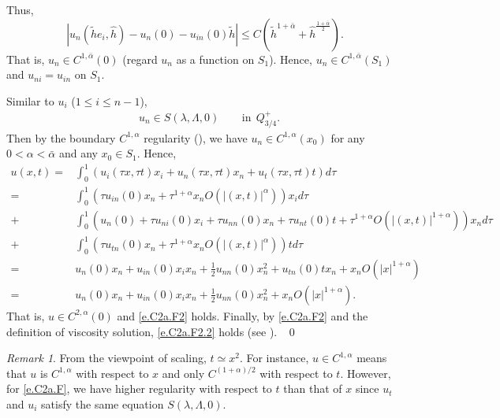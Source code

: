 \documentclass[preprint,12pt]{elsarticle}
\theoremstyle{definition}
\theoremstyle{remark}
\newtheorem{remark}[theorem]{Remark}
\numberwithin{equation}{section}
\begin{document}
Thus,
\begin{equation*}
  |u_n(\tilde{h}e_i,\hat{h})-u_n(0)-u_{in}(0)\tilde{h}|
  \leq C\left(\tilde{h}^{1+\bar{\alpha}}+\hat{h}^{\frac{1+\bar{\alpha}}{2}}\right).
\end{equation*}
That is, $u_n\in C^{1,\bar{\alpha}}(0)$ (regard $u_n$ as a function on $S_1$). Hence, $u_n\in C^{1,\bar{\alpha}}(S_{1})$ and $u_{ni}=u_{in}$ on $S_{1}$.

Similar to $u_i$ ($1\leq i\leq n-1$),
\begin{equation*}
\begin{aligned}
&u_{n}\in S(\lambda,\Lambda,0)&& ~~\mbox{in}~~Q_{3/4}^+.
\end{aligned}
\end{equation*}
Then by the boundary $C^{1,\alpha}$ regularity (), we have $u_n\in C^{1,\alpha}(x_0)$ for any $0<\alpha<\bar{\alpha}$ and any $x_0\in S_{1}$. Hence,
\begin{equation*}
  \begin{aligned}
    u(x,t)=&\int_{0}^{1}(u_i(\tau x,\tau t)x_i+u_n(\tau x,\tau t)x_n+u_t(\tau x,\tau t)t)d\tau \\
=&\int_{0}^{1}(\tau u_{in}(0)x_n+\tau ^{1+\alpha}x_nO(|(x,t)|^{\alpha}))x_id\tau\\
    +&\int_{0}^{1}(u_n(0)+\tau u_{ni}(0)x_i
    +\tau u_{nn}(0)x_n+\tau u_{nt}(0)t
    +\tau^{1+\alpha}O(|(x,t)|^{1+\alpha}))x_nd\tau\\
    +&\int_{0}^{1}(\tau u_{tn}(0)x_n+\tau^{1+\alpha}x_nO(|(x,t)|^{\alpha}))t d\tau\\
=&u_n(0)x_n+u_{in}(0)x_ix_n+\frac{1}{2}u_{nn}(0)x_n^2+u_{tn}(0)tx_n+x_nO(|x|^{1+\alpha})\\
=&u_n(0)x_n+u_{in}(0)x_ix_n+\frac{1}{2}u_{nn}(0)x_n^2+x_nO(|x|^{1+\alpha}).
  \end{aligned}
\end{equation*}
That is, $u\in C^{2,\alpha}(0)$ and \cref{e.C2a.F2} holds. Finally, by \cref{e.C2a.F2} and the definition of viscosity solution, \cref{e.C2a.F2.2} holds (see \cite[Lemma 2.5]{MR1351007}).
~\qed~\\

\begin{remark}\label{re.C2a.F3}
From the viewpoint of scaling, $t\simeq x^2$. For instance, $u\in C^{1,\alpha}$ means that $u$ is $C^{1,\alpha}$ with respect to $x$ and only $C^{(1+\alpha)/2}$ with respect to $t$. However, for \cref{e.C2a.F}, we have higher regularity with respect to $t$ than that of $x$ since $u_t$ and $u_i$ satisfy the same equation $S(\lambda,\Lambda,0)$.
\end{remark}
\end{document}
